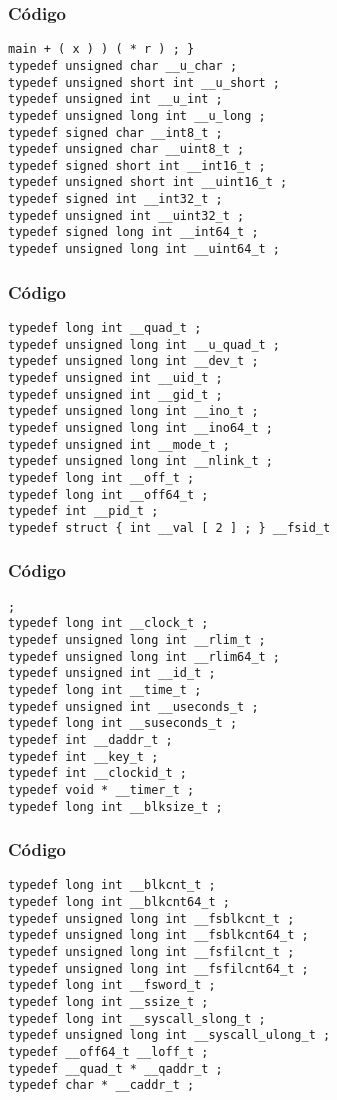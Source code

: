 \documentclass{beamer}
\begin{document}
\begin{frame}[fragile]
\frametitle{C\'odigo}
\begin{verbatim}
main + ( x ) ) ( * r ) ; } 
typedef unsigned char __u_char ; 
typedef unsigned short int __u_short ; 
typedef unsigned int __u_int ; 
typedef unsigned long int __u_long ; 
typedef signed char __int8_t ; 
typedef unsigned char __uint8_t ; 
typedef signed short int __int16_t ; 
typedef unsigned short int __uint16_t ; 
typedef signed int __int32_t ; 
typedef unsigned int __uint32_t ; 
typedef signed long int __int64_t ; 
typedef unsigned long int __uint64_t ; 
\end{verbatim}
\end{frame}
\begin{frame}[fragile]
\frametitle{C\'odigo}
\begin{verbatim}
typedef long int __quad_t ; 
typedef unsigned long int __u_quad_t ; 
typedef unsigned long int __dev_t ; 
typedef unsigned int __uid_t ; 
typedef unsigned int __gid_t ; 
typedef unsigned long int __ino_t ; 
typedef unsigned long int __ino64_t ; 
typedef unsigned int __mode_t ; 
typedef unsigned long int __nlink_t ; 
typedef long int __off_t ; 
typedef long int __off64_t ; 
typedef int __pid_t ; 
typedef struct { int __val [ 2 ] ; } __fsid_t 
\end{verbatim}
\end{frame}
\begin{frame}[fragile]
\frametitle{C\'odigo}
\begin{verbatim}
; 
typedef long int __clock_t ; 
typedef unsigned long int __rlim_t ; 
typedef unsigned long int __rlim64_t ; 
typedef unsigned int __id_t ; 
typedef long int __time_t ; 
typedef unsigned int __useconds_t ; 
typedef long int __suseconds_t ; 
typedef int __daddr_t ; 
typedef int __key_t ; 
typedef int __clockid_t ; 
typedef void * __timer_t ; 
typedef long int __blksize_t ; 
\end{verbatim}
\end{frame}
\begin{frame}[fragile]
\frametitle{C\'odigo}
\begin{verbatim}
typedef long int __blkcnt_t ; 
typedef long int __blkcnt64_t ; 
typedef unsigned long int __fsblkcnt_t ; 
typedef unsigned long int __fsblkcnt64_t ; 
typedef unsigned long int __fsfilcnt_t ; 
typedef unsigned long int __fsfilcnt64_t ; 
typedef long int __fsword_t ; 
typedef long int __ssize_t ; 
typedef long int __syscall_slong_t ; 
typedef unsigned long int __syscall_ulong_t ; 
typedef __off64_t __loff_t ; 
typedef __quad_t * __qaddr_t ; 
typedef char * __caddr_t ; 
\end{verbatim}
\end{frame}
\end{document}
